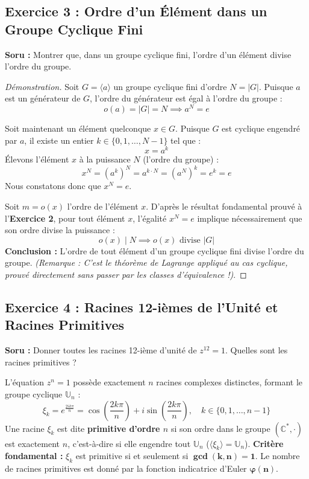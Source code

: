 \documentclass[12pt,a4paper]{report}
\begin{document}
\vspace{0.5cm}

\subsection*{Exercice 3 : Ordre d'un Élément dans un Groupe Cyclique Fini}
\textbf{Soru :} Montrer que, dans un groupe cyclique fini, l'ordre d'un élément divise l'ordre du groupe.

\begin{proof}[Démonstration]
Soit $G = \langle a \rangle$ un groupe cyclique fini d'ordre $N = |G|$.
Puisque $a$ est un générateur de $G$, l'ordre du générateur est égal à l'ordre du groupe :
\[ o(a) = |G| = N \implies a^N = e \]

Soit maintenant un élément quelconque $x \in G$.
Puisque $G$ est cyclique engendré par $a$, il existe un entier $k \in \{0, 1, \dots, N-1\}$ tel que :
\[ x = a^k \]
Élevons l'élément $x$ à la puissance $N$ (l'ordre du groupe) :
\[ x^N = (a^k)^N = a^{k \cdot N} = (a^N)^k = e^k = e \]
Nous constatons donc que $x^N = e$.

Soit $m = o(x)$ l'ordre de l'élément $x$.
D'après le résultat fondamental prouvé à l'\textbf{Exercice 2}, pour tout élément $x$, l'égalité $x^N = e$ implique nécessairement que son ordre divise la puissance :
\[ o(x) \mid N \implies o(x) \text{ divise } |G| \]
\textbf{Conclusion :} L'ordre de tout élément d'un groupe cyclique fini divise l'ordre du groupe. \textit{(Remarque : C'est le théorème de Lagrange appliqué au cas cyclique, prouvé directement sans passer par les classes d'équivalence !)}.
\end{proof}

\vspace{0.5cm}

\subsection*{Exercice 4 : Racines 12-ièmes de l'Unité et Racines Primitives}
\textbf{Soru :} Donner toutes les racines 12-ième d'unité de $z^{12} = 1$. Quelles sont les racines primitives ?

\begin{tcolorbox}[colback=purple!5!white,colframe=purple!75!black,title=Rappel : Racines de l'Unité $\mathbb{U}_n$ et Racines Primitives]
L'équation $z^n = 1$ possède exactement $n$ racines complexes distinctes, formant le groupe cyclique $\mathbb{U}_n$ :
\[ \xi_k = e^{\frac{2ik\pi}{n}} = \cos\left(\frac{2k\pi}{n}\right) + i \sin\left(\frac{2k\pi}{n}\right), \quad k \in \{0, 1, \dots, n-1\} \]
Une racine $\xi_k$ est dite \textbf{primitive d'ordre $n$} si son ordre dans le groupe $(\mathbb{C}^*, \cdot)$ est exactement $n$, c'est-à-dire si elle engendre tout $\mathbb{U}_n$ ($\langle \xi_k \rangle = \mathbb{U}_n$).
\textbf{Critère fondamental :} $\xi_k$ est primitive si et seulement si $\mathbf{\gcd(k, n) = 1}$.
Le nombre de racines primitives est donné par la fonction indicatrice d'Euler $\mathbf{\varphi(n)}$.
\end{tcolorbox}
\end{document}

